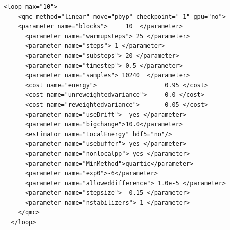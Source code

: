 \begin{lstlisting}[style=QMCPXML,caption=``Sample XML optimization block.",label=lst:lam_xml_opt]
  <loop max="10">
    <qmc method="linear" move="pbyp" checkpoint="-1" gpu="no">
    <parameter name="blocks">     10  </parameter>
      <parameter name="warmupsteps"> 25 </parameter>
      <parameter name="steps"> 1 </parameter>
      <parameter name="substeps"> 20 </parameter>
      <parameter name="timestep"> 0.5 </parameter>
      <parameter name="samples"> 10240  </parameter>
      <cost name="energy">                   0.95 </cost>
      <cost name="unreweightedvariance">     0.0 </cost>
      <cost name="reweightedvariance">       0.05 </cost>
      <parameter name="useDrift">  yes </parameter>
      <parameter name="bigchange">10.0</parameter>
      <estimator name="LocalEnergy" hdf5="no"/>
      <parameter name="usebuffer"> yes </parameter>
      <parameter name="nonlocalpp"> yes </parameter>
      <parameter name="MinMethod">quartic</parameter>
      <parameter name="exp0">-6</parameter>
      <parameter name="alloweddifference"> 1.0e-5 </parameter>
      <parameter name="stepsize">  0.15 </parameter>
      <parameter name="nstabilizers"> 1 </parameter>
    </qmc>
  </loop>
\end{lstlisting}

